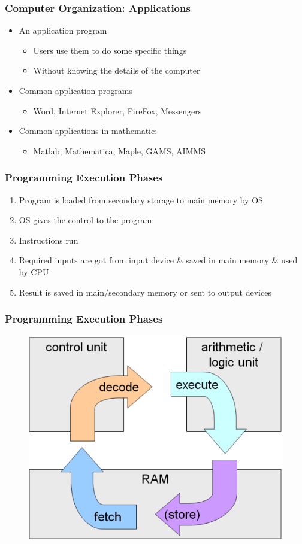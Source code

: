 \documentclass{../c-lecture}
\begin{document}
\begin{frame}
  \frametitle{Computer Organization: Applications}
  \begin{itemize}
    \item An application program
    \begin{itemize}
      \item Users use them to do some specific things
      \item \color{Orange} Without knowing the details of the computer
    \end{itemize}
    \item Common application programs
    \begin{itemize}
      \item Word, Internet Explorer, FireFox, Messengers
    \end{itemize}
    \item Common applications in mathematic:
    \begin{itemize}
      \item Matlab, Mathematica, Maple, GAMS, AIMMS
    \end{itemize}
  \end{itemize}
\end{frame}

\begin{frame}
  \frametitle{Programming Execution Phases}
  \begin{enumerate}
    \item Program is loaded from secondary storage to main memory by OS
    \item OS gives the control to the program
    \item Instructions run
    \item
      Required inputs are got from input device \& saved in main memory \&
      used by CPU
    \item Result is saved in main/secondary memory or sent to output devices
  \end{enumerate}
\end{frame}

\begin{frame}
  \frametitle{Programming Execution Phases}
  \begin{figure}
    \includegraphics[width=.75\textwidth]{./img/cycle.png}
  \end{figure}
\end{frame}
\end{document}
